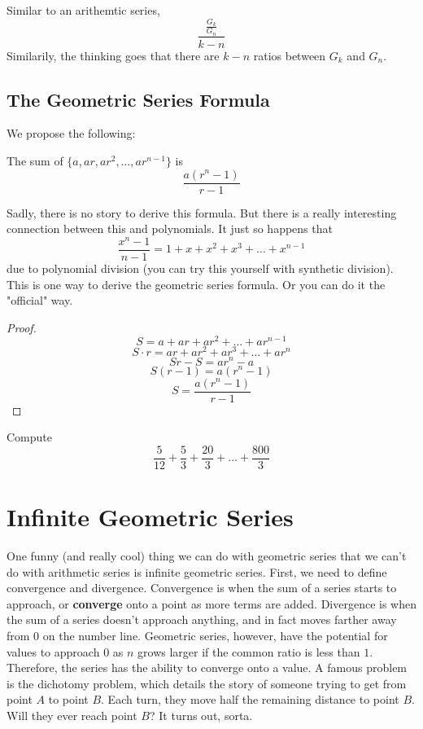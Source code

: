 Similar to an arithemtic series, 
\[\frac{\frac{G_k}{G_n}}{k-n}\]
Similarily, the thinking goes that there are $k-n$ ratios between $G_k$ and $G_n$.
\subsection{The Geometric Series Formula}
We propose the following:
\begin{lemma}
    The sum of $\{a, ar, ar^2,\dots,ar^{n-1}\}$ is 
    \[\frac{a(r^n-1)}{r-1}\]
\end{lemma}
Sadly, there is no story to derive this formula. But there is a really interesting connection between this and polynomials. It just so happens that 
\[\frac{x^n-1}{n-1}=1+x+x^2+x^3+\dots+x^{n-1}\]
due to polynomial division (you can try this yourself with synthetic division). This is one way to derive the geometric series formula. Or you can do it the "official" way.
\begin{proof}
    \[S=a+ar+ar^2+\dots+ar^{n-1}\]
    \[S\cdot r=ar+ar^2+ar^3+\dots+ar^n\]
    \[Sr-S=ar^n-a\]
    \[S(r-1)=a(r^n-1)\]
    \[S=\frac{a(r^n-1)}{r-1}\]
\end{proof}
\begin{problem}
    Compute
    \[\frac{5}{12}+\frac{5}{3}+\frac{20}{3}+\dots+\frac{800}{3}\]
\end{problem}
\section{Infinite Geometric Series}
One funny (and really cool) thing we can do with geometric series that we can't do with arithmetic series is infinite geometric series. First, we need to define convergence and divergence. Convergence is when the sum of a series starts to approach, or \textbf{converge} onto a point as more terms are added. Divergence is when the sum of a series doesn't approach anything, and in fact moves farther away from $0$ on the number line.
Geometric series, however, have the potential for values to approach $0$ as $n$ grows larger if the common ratio is less than $1$. Therefore, the series has the ability to converge onto a value.
A famous problem is the dichotomy problem, which details the story of someone trying to get from point $A$ to point $B$. Each turn, they move half the remaining distance to point $B$. Will they ever reach point $B$? It turns out, sorta. 
